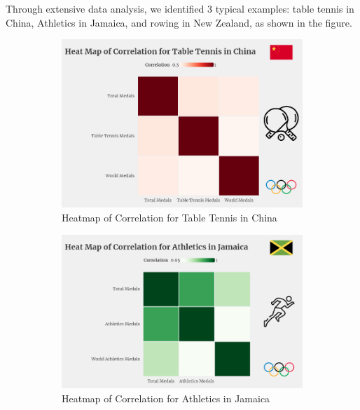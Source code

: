 \documentclass[12pt]{article}  %
\begin{document}
Through extensive data analysis, we identified 3 typical examples: table tennis in China, Athletics in Jamaica, and rowing in New Zealand, as shown in the figure.
\begin{figure}[H]
	\centering
	\begin{subfigure}[b]{.3\textwidth}
		\includegraphics[width=\textwidth]{img/Table Tennis.png}
		\caption{Heatmap of Correlation for Table Tennis in China}\label{subfig:1}
	\end{subfigure}
	\hfill 
	\begin{subfigure}[b]{.33\textwidth}
		\includegraphics[width=\textwidth]{img/Jamaica.png}
		\caption{ Heatmap of Correlation for Athletics in Jamaica}\label{subfig:2}
	\end{subfigure}
	\hfill 
	\begin{subfigure}[b]{.32\textwidth}

\end{subfigure}
\end{figure}
\end{document}

